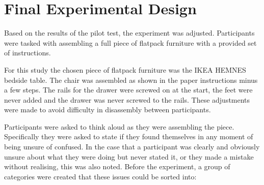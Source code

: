 \documentclass{l4proj}
\begin{document}
\section{Final Experimental Design}

Based on the results of the pilot test, the experiment was adjusted. Participants were tasked with assembling a full piece of flatpack furniture with a provided set of instructions. 

For this study the chosen piece of flatpack furniture was the IKEA HEMNES bedside table. The chair was assembled as shown in the paper instructions minus a few steps. The rails for the drawer were screwed on at the start, the feet were never added and the drawer was never screwed to the rails. These adjustments were made to avoid difficulty in disassembly between participants.

Participants were asked to think aloud as they were assembling the piece. Specifically they were asked to state if they found themselves in any moment of being unsure of confused. In the case that a participant was clearly and obviously unsure about what they were doing but never stated it, or they made a mistake without realising, this was also noted. Before the experiment, a group of categories were created that these issues could be sorted into:
\end{document}
